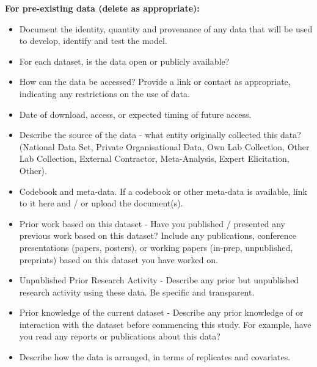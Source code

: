 \documentclass[
]{article}
\providecommand{\tightlist}{%
  \setlength{\itemsep}{0pt}\setlength{\parskip}{0pt}}
\begin{document}
\begin{tcolorbox}[enhanced jigsaw, opacitybacktitle=0.6, bottomrule=.15mm, leftrule=.75mm, rightrule=.15mm, colbacktitle=quarto-callout-caution-color!10!white, toprule=.15mm, titlerule=0mm, left=2mm, colframe=quarto-callout-caution-color-frame, breakable, title=\textcolor{quarto-callout-caution-color}{\faFire}\hspace{0.5em}{Preregistration Item}, opacityback=0, coltitle=black, bottomtitle=1mm, colback=white, toptitle=1mm, arc=.35mm]

\textbf{For pre-existing data (delete as appropriate):}

\begin{itemize}
\tightlist
\item[$\square$]
  Document the identity, quantity and provenance of any data that will
  be used to develop, identify and test the model.
\item[$\square$]
  For each dataset, is the data open or publicly available?
\item[$\square$]
  How can the data be accessed? Provide a link or contact as
  appropriate, indicating any restrictions on the use of data.
\item[$\square$]
  Date of download, access, or expected timing of future access.
\item[$\square$]
  Describe the source of the data - what entity originally collected
  this data? (National Data Set, Private Organisational Data, Own Lab
  Collection, Other Lab Collection, External Contractor, Meta-Analysis,
  Expert Elicitation, Other).
\item[$\square$]
  Codebook and meta-data. If a codebook or other meta-data is available,
  link to it here and / or upload the document(s).
\item[$\square$]
  Prior work based on this dataset - Have you published / presented any
  previous work based on this dataset? Include any publications,
  conference presentations (papers, posters), or working papers
  (in-prep, unpublished, preprints) based on this dataset you have
  worked on.
\item[$\square$]
  Unpublished Prior Research Activity - Describe any prior but
  unpublished research activity using these data. Be specific and
  transparent.
\item[$\square$]
  Prior knowledge of the current dataset - Describe any prior knowledge
  of or interaction with the dataset before commencing this study. For
  example, have you read any reports or publications about this data?
\item[$\square$]
  Describe how the data is arranged, in terms of replicates and
  covariates.
\end{itemize}


\end{tcolorbox}
\end{document}
